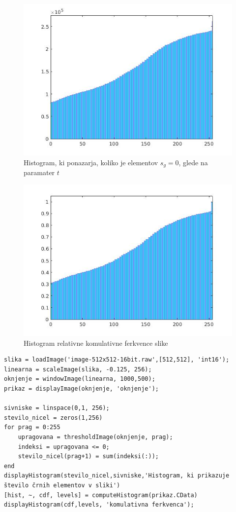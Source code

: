 \documentclass[12pt,a4paper]{article}
\begin{document}
\begin{figure}[h!]
  \begin{center}
    \includegraphics[scale = 0.7]{histogram1.jpg}
    \caption{Histogram, ki ponazarja, koliko je elementov $s_g = 0$, glede na paramater $t$}
    \label{fig:}
  \end{center}
\end{figure} 
\pagebreak
\begin{figure}
  \begin{center}
    \includegraphics[scale = 0.7]{histogram2.jpg}
    \caption{Histogram relativne komulativne ferkvence slike}
    \label{fig:}
  \end{center}
\end{figure}
\begin{verbatim}
slika = loadImage('image-512x512-16bit.raw',[512,512], 'int16');
linearna = scaleImage(slika, -0.125, 256);
oknjenje = windowImage(linearna, 1000,500);
prikaz = displayImage(oknjenje, 'oknjenje');

sivniske = linspace(0,1, 256);
stevilo_nicel = zeros(1,256)
for prag = 0:255
    upragovana = thresholdImage(oknjenje, prag);
    indeksi = upragovana <= 0;
    stevilo_nicel(prag+1) = sum(indeksi(:));
end
displayHistogram(stevilo_nicel,sivniske,'Histogram, ki prikazuje število črnih elementov v sliki')
[hist, ~, cdf, levels] = computeHistogram(prikaz.CData)
displayHistogram(cdf,levels, 'komulativna ferkvenca');
\end{verbatim}
\pagebreak
\end{document}
